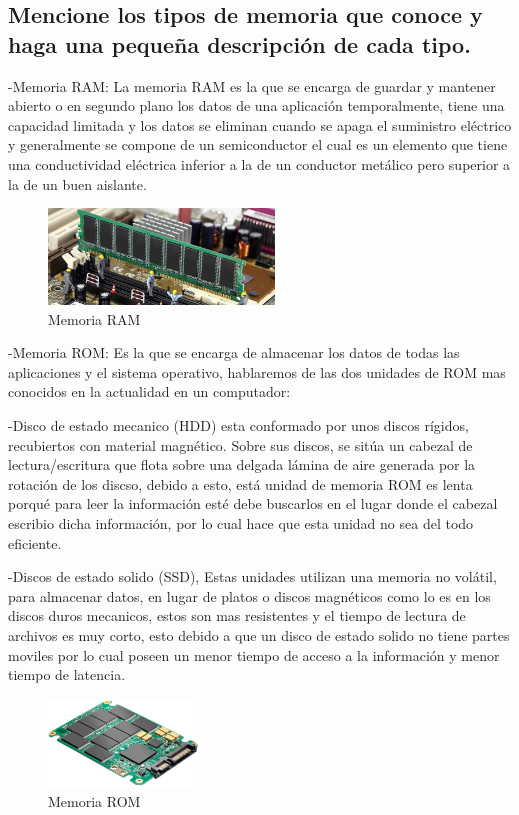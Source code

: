 \documentclass{article}
\begin{document}
\subsection{Mencione los tipos de memoria que conoce y haga una pequeña descripción de cada tipo.}
-Memoria RAM: La memoria RAM es la que se encarga de guardar y mantener abierto o en segundo plano los datos de una aplicación temporalmente,  tiene una capacidad limitada y los datos se eliminan cuando se apaga el suministro eléctrico y generalmente se compone de un semiconductor el cual es un elemento que tiene una conductividad eléctrica inferior a la de un conductor metálico pero superior a la de un buen aislante. \newline

\begin{figure}[h]
\includegraphics[width=6cm]{Memoria.jpg}
\centering
\caption{Memoria RAM}
\end{figure}

-Memoria ROM: Es la que se encarga de almacenar los datos de todas las aplicaciones y el sistema operativo, hablaremos de las dos unidades de ROM mas conocidos en la actualidad en un computador:

-Disco de estado mecanico (HDD) esta conformado por unos discos rígidos, recubiertos con material magnético. Sobre sus discos, se sitúa un cabezal de lectura/escritura que flota sobre una delgada lámina de aire generada por la rotación de los discso, debido a esto, está unidad de memoria ROM es lenta porqué para leer la información esté debe buscarlos en el lugar donde el cabezal escribio dicha información, por lo cual hace que esta unidad no sea del todo eficiente.

-Discos de estado solido (SSD), Estas unidades utilizan una memoria no volátil, para almacenar datos, en lugar de platos o discos magnéticos como lo es en los discos duros mecanicos, estos son mas resistentes y el tiempo de lectura de archivos es muy corto, esto debido a que un disco de estado solido no tiene partes moviles por lo cual poseen un menor tiempo de acceso a la información y menor tiempo de latencia.
\newline

\begin{figure}[h]
\includegraphics[width=4cm]{ssd.jpg}
\centering
\caption{Memoria ROM}
\end{figure} 
\end{document}
